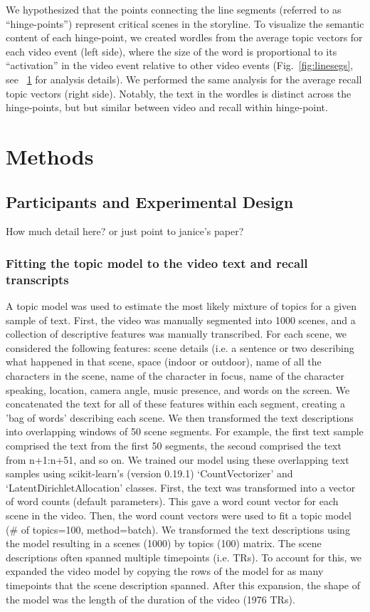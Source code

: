 \documentclass{article}
\begin{document}
{We hypothesized that the points connecting the line segments (referred to as ``hinge-points'') represent critical scenes in the storyline. To visualize the semantic content of each hinge-point, we created wordles from the average topic vectors for each video event (left side), where the size of the word is proportional to its ``activation'' in the video event relative to other video events (Fig.~\ref{fig:linesegs}, see ~\ref{sec:methods} for analysis details). We performed the same analysis for the average recall topic vectors (right side). Notably, the text in the wordles is distinct across the hinge-points, but but similar between video and recall within hinge-point.

\section{Methods}
\label{sec:methods}

\subsection{Participants and Experimental Design}
How much detail here? or just point to janice's paper?

\subsubsection{Fitting the topic model to the video text and recall transcripts}
A topic model was used to estimate the most likely mixture of topics for a given sample of text. First, the video was manually segmented into 1000 scenes, and a collection of descriptive features was manually transcribed. For each scene, we considered the following features: scene details (i.e. a sentence or two describing what happened in that scene, space (indoor or outdoor), name of all the characters in the scene, name of the character in focus, name of the character speaking, location, camera angle, music presence, and words on the screen. We concatenated the text for all of these features within each segment, creating a 'bag of words' describing each scene. We then transformed the text descriptions into overlapping windows of 50 scene segments. For example, the first text sample comprised the text from the first 50 segments, the second comprised the text from n+1:n+51, and so on. We trained our model using these overlapping text samples using scikit-learn's (version 0.19.1) `CountVectorizer' and `LatentDirichletAllocation' classes.  First, the text was transformed into a vector of word counts (default parameters). This gave a word count vector for each scene in the video.  Then, the word count vectors were used to fit a topic model (\# of topics=100, method=batch). We transformed the text descriptions using the model resulting in a scenes (1000) by topics (100) matrix. The scene descriptions often spanned multiple timepoints (i.e. TRs). To account for this, we expanded the video model by copying the rows of the model for as many timepoints that the scene description spanned. After this expansion, the shape of the model was the length of the duration of the video (1976 TRs).

}
\end{document}
